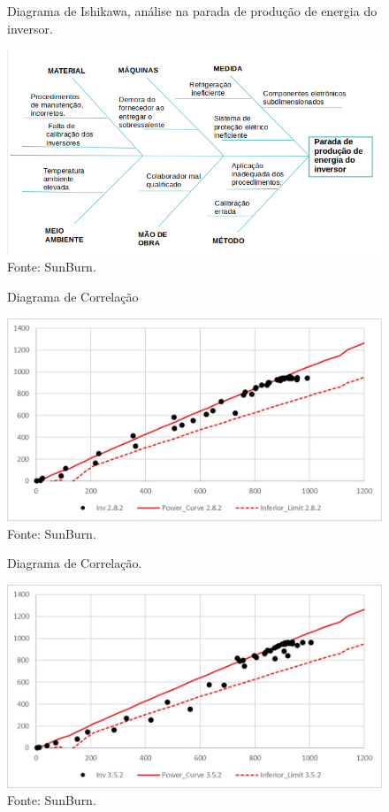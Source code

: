 \begin{figure}[H]
    \caption{Diagrama de Ishikawa, análise na parada de produção de energia do inversor.} %
    \includegraphics[width=1\textwidth]{images/ishikawa_aplicacao.png}
    \caption*{Fonte: SunBurn.}
    \label{fig:ishikawa_aplicacao}
  \end{figure}

  
  \begin{figure}[H]
    \caption{Diagrama de Correlação} %
    \includegraphics[width=1\textwidth]{images/correlacao_1.jpeg}
    \caption*{Fonte: SunBurn.}
    \label{fig:correlacao1_aplicacao}
  \end{figure}

  
  \begin{figure}[H]
    \caption{Diagrama de Correlação.} %
    \includegraphics[width=1\textwidth]{images/correlacao_2.jpeg}
    \caption*{Fonte: SunBurn.}
    \label{fig:correlacao2_aplicacao}
  \end{figure}


